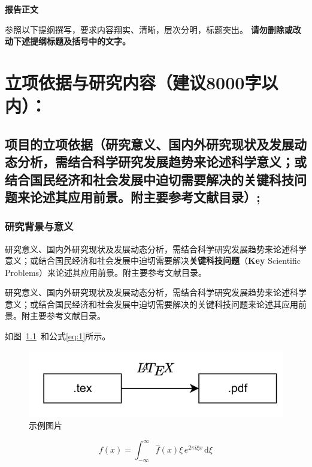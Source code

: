 \documentclass{nsfc}
\begin{document}

\begin{center}
    \Large\kaishu\textbf{报告正文}
\end{center}

\begin{onehalfspace}
    \large\kaishu
    参照以下提纲撰写，要求内容翔实、清晰，层次分明，标题突出。
    {\color{nsfc_blue}\textbf{请勿删除或改动下述提纲标题及括号中的文字。}}
\end{onehalfspace}

\chapter{立项依据与研究内容{\mdseries（建议8000字以内）：}}

\section{\textbf{项目的立项依据}（研究意义、国内外研究现状及发展动态分析，需结合科学研究发展趋势来论述科学意义；或结合国民经济和社会发展中迫切需要解决的关键科技问题来论述其应用前景。附主要参考文献目录）;}

\subsection{研究背景与意义}

研究意义、国内外研究现状及发展动态分析，需结合科学研究发展趋势来论述科学意义；或结合国民经济和社会发展中迫切需要解决\textbf{关键科技问题}（\textbf{Key} Scientific Problems）来论述其应用前景。附主要参考文献目录。

{\kaishu 研究意义、国内外研究现状及发展动态分析，需结合科学研究发展趋势来论述科学意义；或结合国民经济和社会发展中迫切需要解决的关键科技问题来论述其应用前景\cite{latex2e,latex:companion}。附主要参考文献目录。}

如图~\ref{fig:test}~和公式\eqref{eq:1}所示。

\begin{figure}[h]
    \centering
    \includegraphics[width=0.4\linewidth]{figure1.png}
    \caption{示例图片}
    \label{fig:test}
\end{figure}

\begin{equation}\label{eq:1}
    f(x) = \int_{-\infty}^\infty  \hat f(x)\xi\,e^{2 \pi i \xi x}  \,\mathrm{d}\xi 
\end{equation}
\end{document}
